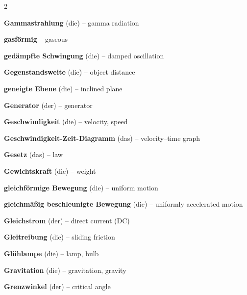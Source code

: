 \begin{multicols}{2}
\par\nopagebreak
\textbf{Gammastrahlung} (die) -- gamma radiation\dotfill\hyperref[e:277]{\pageref*{e:277}}\par
\textbf{gasförmig} -- gaseous\dotfill\hyperref[e:128]{\pageref*{e:128}}\par
\textbf{gedämpfte Schwingung} (die) -- damped oscillation\dotfill\hyperref[e:198]{\pageref*{e:198}}\par
\textbf{Gegenstandsweite} (die) -- object distance\dotfill\hyperref[e:246]{\pageref*{e:246}}\par
\textbf{geneigte Ebene} (die) -- inclined plane\dotfill\hyperref[e:85]{\pageref*{e:85}}\par
\textbf{Generator} (der) -- generator\dotfill\hyperref[e:187]{\pageref*{e:187}}\par
\textbf{Geschwindigkeit} (die) -- velocity, speed\dotfill\hyperref[e:37]{\pageref*{e:37}}\par
\textbf{Geschwindigkeit-Zeit-Diagramm} (das) -- velocity–time graph\dotfill\hyperref[e:45]{\pageref*{e:45}}\par
\textbf{Gesetz} (das) -- law\dotfill\hyperref[e:21]{\pageref*{e:21}}\par
\textbf{Gewichtskraft} (die) -- weight\dotfill\hyperref[e:63]{\pageref*{e:63}}\par
\textbf{gleichförmige Bewegung} (die) -- uniform motion\dotfill\hyperref[e:42]{\pageref*{e:42}}\par
\textbf{gleichmäßig beschleunigte Bewegung} (die) -- uniformly accelerated motion\dotfill\hyperref[e:43]{\pageref*{e:43}}\par
\textbf{Gleichstrom} (der) -- direct current (DC)\dotfill\hyperref[e:166]{\pageref*{e:166}}\par
\textbf{Gleitreibung} (die) -- sliding friction\dotfill\hyperref[e:68]{\pageref*{e:68}}\par
\textbf{Glühlampe} (die) -- lamp, bulb\dotfill\hyperref[e:158]{\pageref*{e:158}}\par
\textbf{Gravitation} (die) -- gravitation, gravity\dotfill\hyperref[e:93]{\pageref*{e:93}}\par
\textbf{Grenzwinkel} (der) -- critical angle\dotfill\hyperref[e:239]{\pageref*{e:239}}\par


\end{multicols}
